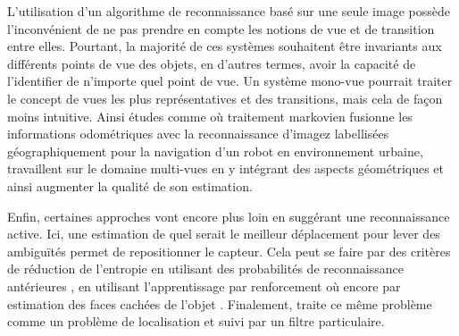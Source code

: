 L'utilisation d'un algorithme de reconnaissance basé sur une seule image possède l'inconvénient de ne pas prendre en compte les notions de vue et de transition entre elles. Pourtant, la majorité de ces systèmes souhaitent être invariants aux différents points de vue des objets, en d'autres termes, avoir la capacité de l'identifier de n'importe quel point de vue. Un système mono-vue pourrait traiter le concept de vues les plus représentatives et des transitions, mais cela de façon moins intuitive. Ainsi études comme \cite{le2014global} où traitement markovien fusionne les informations odométriques avec la reconnaissance d'imagez labellisées géographiquement pour la navigation d'un robot en environnement urbaine, travaillent sur le domaine multi-vues en y intégrant des aspects géométriques et ainsi augmenter la qualité de son estimation.
  
Enfin, certaines approches vont encore plus loin en suggérant une reconnaissance active. Ici, une estimation de quel serait le meilleur déplacement pour lever des ambiguïtés permet de repositionner le capteur. Cela peut se faire par des critères de réduction de l'entropie en utilisant des probabilités de reconnaissance antérieures \cite{borotschnig1998active}, en utilisant l'apprentissage par renforcement \cite{borji2009learning} où encore par estimation des faces cachées de l'objet \cite{banta2000next}. Finalement, \cite{browatzki2012active} traite ce même problème comme un problème de localisation et suivi par un filtre particulaire.


%
%


